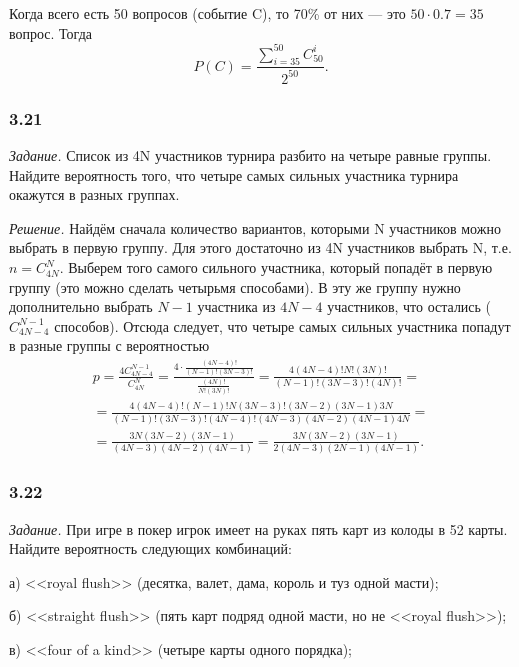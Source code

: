 \documentclass{book}
\begin{document}
Когда всего есть 50 вопросов (событие C), то 70\% от них --- это $ 50 \cdot 0.7 = 35$ вопрос.
Тогда
$$ P \left( C \right) =
\frac{ \sum \limits_{i=35}^{50} C_{50}^i}{2^{50}}.$$

\subsubsection*{3.21}

\textit{Задание.} Список из 4N участников турнира разбито на четыре равные группы.
Найдите вероятность того, что четыре самых сильных участника турнира окажутся в разных группах. 

\textit{Решение.} Найдём сначала количество вариантов, которыми N участников можно выбрать в первую группу.
Для этого достаточно из 4N участников выбрать N, т.е. $ n = C_{4N}^N $.
Выберем того самого сильного участника, который попадёт в первую группу (это можно сделать четырьмя способами).
В эту же группу нужно дополнительно выбрать $ N - 1 $ участника из $ 4N - 4 $ участников, что остались ($ C_{ 4N - 4 }^{ N - 1 } $ способов).
Отсюда следует, что четыре самых сильных участника попадут в разные группы с вероятностью
\begin{equation*}
\begin{split}
p =
\frac{ 4C_{ 4N - 4 }^{ N - 1 } }{ C_{ 4N }^N } =
\frac{ 4 \cdot \frac{ (4N-4)! }{ ( N - 1 )!( 3 N - 3)! } }{ \frac{ (4N)! }{ N!(3N)! } } =
\frac{ 4(4N-4)!N!(3N)! }{ (N-1)!(3N-3)!(4N)! } = \\
= \frac{ 4(4N-4)!(N-1)!N(3N-3)!(3N-2)(3N-1)3N }{ (N-1)!(3N-3)!(4N-4)!(4N-3)(4N-2)(4N-1)4N } = \\
= \frac{ 3N(3N-2)(3N-1) }{ (4N-3)(4N-2)(4N-1) } =
\frac{ 3N(3N-2)(3N-1) }{ 2(4N-3)(2N-1)(4N-1) }.
\end{split}
\end{equation*}

\subsubsection*{3.22}

\textit{Задание.} При игре в покер игрок имеет на руках пять карт из колоды в 52 карты.
Найдите вероятность следующих комбинаций:

а) <<royal flush>> (десятка, валет, дама, король и туз одной масти);

б) <<straight flush>> (пять карт подряд одной масти, но не <<royal flush>>);

в) <<four of a kind>> (четыре карты одного порядка);
\end{document}
